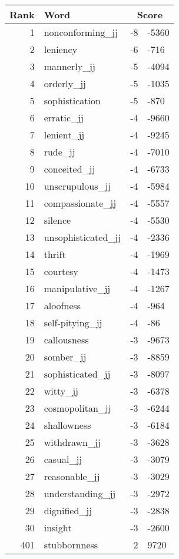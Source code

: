 \begin{longtable}[!htbp]{| rlr@{.}l |}
    \hline
    \textbf{Rank} & \textbf{Word} & \multicolumn{2}{c|}{\textbf{Score}} \\
    \hline
    \endhead
    1 & nonconforming\_jj & -8 & -5360 \\
    2 & leniency & -6 & -716 \\
    3 & mannerly\_jj & -5 & -4094 \\
    4 & orderly\_jj & -5 & -1035 \\
    5 & sophistication & -5 & -870 \\
    6 & erratic\_jj & -4 & -9660 \\
    7 & lenient\_jj & -4 & -9245 \\
    8 & rude\_jj & -4 & -7010 \\
    9 & conceited\_jj & -4 & -6733 \\
    10 & unscrupulous\_jj & -4 & -5984 \\
    11 & compassionate\_jj & -4 & -5557 \\
    12 & silence & -4 & -5530 \\
    13 & unsophisticated\_jj & -4 & -2336 \\
    14 & thrift & -4 & -1969 \\
    15 & courtesy & -4 & -1473 \\
    16 & manipulative\_jj & -4 & -1267 \\
    17 & aloofness & -4 & -964 \\
    18 & self-pitying\_jj & -4 & -86 \\
    19 & callousness & -3 & -9673 \\
    20 & somber\_jj & -3 & -8859 \\
    21 & sophisticated\_jj & -3 & -8097 \\
    22 & witty\_jj & -3 & -6378 \\
    23 & cosmopolitan\_jj & -3 & -6244 \\
    24 & shallowness & -3 & -6184 \\
    25 & withdrawn\_jj & -3 & -3628 \\
    26 & casual\_jj & -3 & -3079 \\
    27 & reasonable\_jj & -3 & -3029 \\
    28 & understanding\_jj & -3 & -2972 \\
    29 & dignified\_jj & -3 & -2838 \\
    30 & insight & -3 & -2600 \\
    401 & stubbornness & 2 & 9720 \\

\end{longtable}
